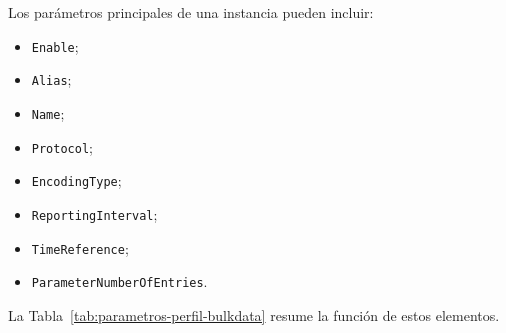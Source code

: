 Los parámetros principales de una instancia pueden incluir:

\begin{itemize}
    \item \texttt{Enable};
    \item \texttt{Alias};
    \item \texttt{Name};
    \item \texttt{Protocol};
    \item \texttt{EncodingType};
    \item \texttt{ReportingInterval};
    \item \texttt{TimeReference};
    \item \texttt{ParameterNumberOfEntries}.
\end{itemize}

La Tabla~\ref{tab:parametros-perfil-bulkdata} resume la función de estos
elementos.

